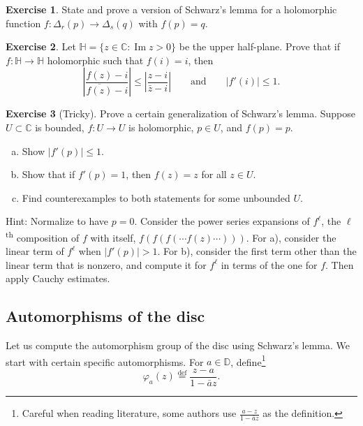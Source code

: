 \documentclass[12pt,openany]{book}
\renewcommand{\Im}{\operatorname{Im}}
\newcommand{\abs}[1]{\left\lvert {#1} \right\rvert}
\newcommand{\C}{{\mathbb{C}}}
\newcommand{\D}{{\mathbb{D}}}
\newcommand{\bH}{{\mathbb{H}}}
\theoremstyle{plain}
\theoremstyle{remark}
\theoremstyle{definition}
\newenvironment{exbox}{%
    \def\FrameCommand{\vrule width 1pt \relax\hspace{10pt}}%
    \MakeFramed{\advance\hsize-\width\FrameRestore}%
}{%
    \endMakeFramed
}
\newenvironment{exparts}{%
    \leavevmode\begin{enumerate}[a),noitemsep,topsep=0pt,parsep=0pt,partopsep=0pt]
}{%
    \end{enumerate}
}
\theoremstyle{exercise}
\newtheorem{exercise}{Exercise}[section]
\theoremstyle{example}
\begin{document}
\begin{exbox}
\begin{exercise}
State and prove a version of Schwarz's lemma for a holomorphic
function $f \colon \Delta_r(p) \to \Delta_s(q)$ with $f(p)=q$.
\end{exercise}

\begin{exercise}
Let $\bH = \{ z \in \C : \Im z > 0 \}$ be the upper half-plane.
Prove that if $f \colon \bH \to \bH$ holomorphic such that $f(i) = i$, then
\begin{equation*}
\abs{\frac{f(z)-i}{\overline{f(z)}-i}} \leq
\abs{\frac{z-i}{\bar{z}-i}} 
\qquad
\text{and}
\qquad
\abs{f'(i)} \leq 1 .
\end{equation*}
\end{exercise}

\begin{exercise}[Tricky]
Prove a certain generalization of Schwarz's lemma.  Suppose $U \subset \C$
is bounded,
$f \colon U \to U$ is holomorphic,
$p \in U$,
and $f(p)=p$.
\begin{exparts}
\item
Show $\abs{f'(p)} \leq 1$.
\item
Show that if $f'(p) = 1$, then $f(z) = z$ for all $z \in U$.
\item
Find counterexamples to both statements for some unbounded $U$.
\end{exparts}
Hint: Normalize to have $p=0$.  Consider the power series
expansions of
$f^{\ell}$, the $\ell$\textsuperscript{th} composition of $f$ with itself,
$f(f(f(\cdots f(z) \cdots)))$.
For a), consider the linear term of $f^{\ell}$ when $\abs{f'(p)}
> 1$.  For b), consider the first term other
than the linear term that is nonzero, and compute it for $f^{\ell}$ in terms
of the one for $f$.  Then apply Cauchy estimates.
\end{exercise}
\end{exbox}

\subsection{Automorphisms of the disc}

Let us compute the automorphism group of the disc using
Schwarz's lemma.
We start with certain specific automorphisms.
For $a \in \D$, define\footnote{%
Careful when reading literature, some authors use $\frac{a-z}{1-\bar{a}z}$ as the definition.}
%
\begin{equation*}
\varphi_a(z) \overset{\text{def}}{=} \frac{z-a}{1-\bar{a}z}.
\end{equation*}
\end{document}
